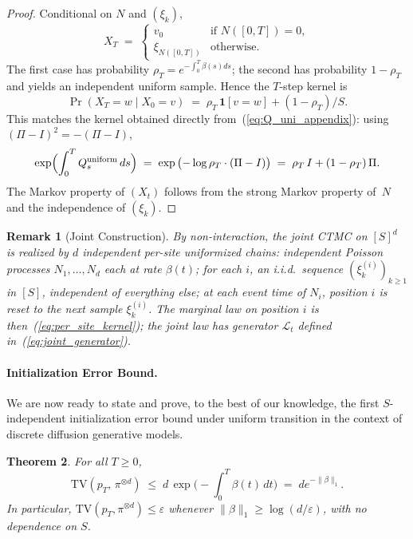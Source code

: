 \documentclass{article} %
\newtheorem{theorem}{Theorem}[section]
\newtheorem{remark}[theorem]{Remark}
\def\eqref#1{equation~\ref{#1}}
\newcommand{\TV}{\mathrm{TV}}
\renewcommand{\eqref}[1]{\textup{(\ref{#1})}}
\newcommand{\Punif}{\Pi}
\begin{document}
\begin{proof}
Conditional on $N$ and $(\xi_k)$,
\[
  X_T \;=\; \begin{cases}
    v_0 & \text{if } N([0,T]) = 0, \\
    \xi_{N([0,T])} & \text{otherwise.}
  \end{cases}
\]
The first case has probability $\rho_T = e^{-\int_0^T \beta(s) ds}$; the
second has probability $1 - \rho_T$ and yields an independent uniform
sample. Hence the $T$-step kernel is
\begin{equation}\label{eq:per_site_kernel}
  \Pr(X_T = w \mid X_0 = v)
   \;=\; \rho_T\,\mathbf{1}[v = w] + (1-\rho_T)/S.
\end{equation}
This matches the kernel obtained directly from~\eqref{eq:Q_uni_appendix}:
using $(\Punif - I)^2 = -(\Punif - I)$,
\[
  \exp\!\Big(\!\int_0^T Q_s^{\rm uniform}\,ds\Big)
  \;=\; \exp\big({-}\log\rho_T \cdot (\Punif - I)\big)
  \;=\; \rho_T\,I + (1-\rho_T)\,\Punif.
\]
The Markov property of $(X_t)$ follows from the strong Markov property
of~$N$ and the independence of $(\xi_k)$. \qedhere
\end{proof}

\begin{remark}[Joint Construction]\label{remark:joint_const}
By non-interaction, the joint CTMC on $[S]^d$ is realized by $d$
\emph{independent} per-site uniformized chains: independent Poisson
processes $N_1, \dots, N_d$ each at rate $\beta(t)$; for each $i$, an
i.i.d.\ sequence $(\xi^{(i)}_k)_{k \ge 1}$ in $[S]$, independent of
everything else; at each event time of $N_i$, position $i$ is reset
to the next sample $\xi^{(i)}_k$. The marginal law on position $i$ is
then~\eqref{eq:per_site_kernel}; the joint law has generator
$\mathcal{L}_t$ defined in~\eqref{eq:joint_generator}.
\end{remark}

\paragraph{Initialization Error Bound.} We are now ready to state and prove, to the best of our knowledge, the first $S$-independent initialization error bound under uniform transition in the context of discrete diffusion generative models.

\begin{theorem}\label{thm:prior_noS_uniform}
For all $T \ge 0$,
\[
  \TV(p_T,\, \pi^{\otimes d}) \;\le\; d\,\exp\!\Big(-\!\int_0^T \beta(t)\,dt\Big) \;=\;  d e^{-\| \beta \|_1}.
\]
In particular, $\TV(p_T, \pi^{\otimes d}) \le \varepsilon$ whenever
$\|\beta\|_1 \ge \log(d/\varepsilon)$, with no dependence on $S$.
\end{theorem}
\end{document}
